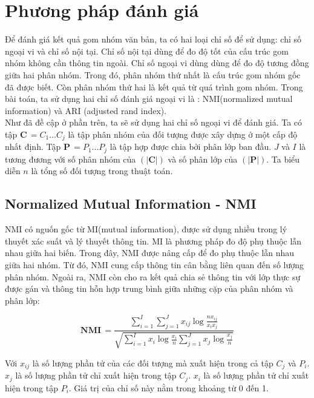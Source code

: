 \section{Phương pháp đánh giá}
\hspace{10mm}Để đánh giá kết quả gom nhóm văn bản, ta có hai loại chỉ số để sử dụng: chỉ số ngoại vi và chỉ số nội tại. Chỉ số nội tại  dùng để đo độ tốt của cấu trúc gom nhóm không cần thông tin ngoài. Chỉ số ngoại vi dùng dùng để đo độ tương đồng giữa hai phân nhóm. Trong đó, phân nhóm thứ nhất là cấu trúc gom nhóm gốc đã được biết. Còn phân nhóm thứ hai là kết quả từ quá trình gom nhóm. Trong bài toán, ta sử dụng hai chỉ số đánh giá ngoại vi là : NMI(normalized mutual information) và ARI (adjusted rand index).\\

\hspace*{10mm}
Như đã đề cập ở phần trên, ta sẽ sử dụng hai chỉ số ngoại vi để đánh giá. Ta có tập $\textbf{C} \, = {C_1 \ldots C_j}$ là tập phân nhóm của đối tượng được xây dựng ở một cấp độ nhất định. Tập $\textbf{P} \, = {P_1 \ldots P_j}$ là tập hợp được chia bởi phân lớp ban đầu. $J$ và $I$ là tương đương với số phân nhóm của $(|\textbf{C}|)$ và số phân lớp của  $(|\textbf{P}|)$. Ta biểu diễn $n$ là tổng số đối tượng trong thuật toán.\\

\subsection{Normalized Mutual Information - NMI}
\hspace{10mm}NMI có nguốn gốc từ MI(mutual information), được sử dụng nhiều trong lý thuyết xác suất và lý thuyết thông tin. MI là phương pháp đo độ phụ thuộc lẫn nhau giữa hai biến. Trong đây, NMI được nâng cấp để đo phụ thuộc lẫn nhau giữa hai nhóm. Từ đó, NMI cung cấp thông tin cân bằng liên quan đến số lượng phân nhóm. Ngoài ra, NMI còn cho ra kết quả chia sẻ thông tin với lớp thực sự được gán và thông tin hỗn hợp trung bình giữa những cặp của phân nhóm và phân lớp:\\
\begin{center}
\begin{equation}
\textbf{NMI} \, = \frac{\sum^I_{i=1} \sum^J_{j=1} x_{ij} \log \frac{n x_{ij}}{x_i x_j}}{\sqrt{\sum^I_{i=1} x_i \log \frac{x_i}{n} \sum^J_{j=1} x_j \log \frac{x_j}{n}}}
\end{equation}
\end{center}
\noindent
\hspace{10mm}Với $x_{ij}$ là số lượng phần tử của các đối tượng mà xuất hiện trong cả tập $C_j$ và $P_i$. $x_j$ là số lượng phần tử chỉ xuất hiện trong tập $C_j$. $x_i$ là số lượng phần tử chỉ xuất hiện trong tập $P_i$. Giá trị của chỉ số này nằm trong khoảng từ 0 đến 1.\\
